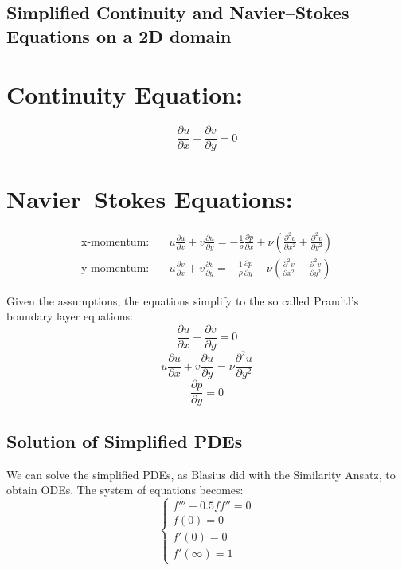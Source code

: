 \documentclass{article}
\begin{document}
\subsection{Simplified Continuity and Navier–Stokes Equations on a 2D domain}

\section*{Continuity Equation:}
\[
\frac{\partial u}{\partial x} + \frac{\partial v}{\partial y} = 0
\]

\section*{Navier–Stokes Equations:}
\begin{align*}
    \text{x-momentum:} & \quad u \frac{\partial u}{\partial x} + v \frac{\partial u}{\partial y} = -\frac{1}{\rho} \frac{\partial p}{\partial x} + \nu (\frac{\partial^2 v}{\partial x^2}+\frac{\partial^2 v}{\partial y^2}) \\
    \text{y-momentum:} & \quad u \frac{\partial v}{\partial x} + v \frac{\partial v}{\partial y} = -\frac{1}{\rho} \frac{\partial p}{\partial y} + \nu (\frac{\partial^2 v}{\partial x^2}+\frac{\partial^2 v}{\partial y^2})
\end{align*}

Given the assumptions, the equations simplify to the so called Prandtl's boundary layer equations:
\[
\frac{\partial u}{\partial x} + \frac{\partial v}{\partial y} = 0
\]
\[
u \frac{\partial u}{\partial x} + v \frac{\partial u}{\partial y} = \nu \frac{\partial^2 u}{\partial y^2}
\]
\[
\frac{\partial p}{\partial y} = 0
\]

\subsection{Solution of Simplified PDEs}
We can solve the simplified PDEs, as Blasius did with the Similarity Ansatz, to obtain ODEs.
The system of equations becomes:
\[
\begin{cases}
f''' + 0.5 f f'' = 0 \\
f(0) = 0 \\
f'(0) = 0 \\
f'(\infty) = 1
\end{cases}
\]
\end{document}
